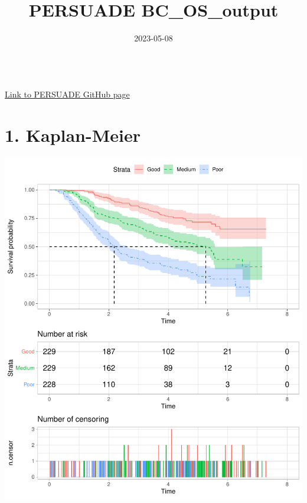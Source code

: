 \documentclass[
]{article}
\title{PERSUADE BC\_OS\_output}
\author{}
\date{\vspace{-2.5em}2023-05-08}
\begin{document}
\maketitle

{
\hypersetup{linkcolor=}
\setcounter{tocdepth}{2}
\tableofcontents
}
~\\

\href{https://github.com/Bram-R/PERSUADE}{Link to PERSUADE GitHub page}
\clearpage

\hypertarget{kaplan-meier}{%
\section{1. Kaplan-Meier}\label{kaplan-meier}}

\begin{flushleft}\includegraphics{Images/plot_KM-1} \end{flushleft}
\end{document}
